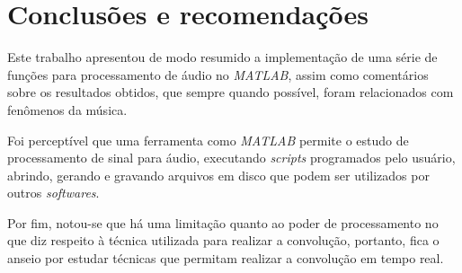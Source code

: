 \documentclass[
	12pt,				%
	article,			%
	openright,			%
	oneside,
	a4paper,			%
	chapter=TITLE,		%
	section=TITLE,		%
	english,			%
	french,				%
	spanish,			%
	brazil,				%
]{abntex2}
\begin{document}
	
	\section[Conclusões e recomendações]{Conclusões e recomendações}
	
	Este trabalho apresentou de modo resumido a implementação de uma série de funções para processamento de áudio no \textit{MATLAB}, assim como comentários sobre os resultados obtidos, que sempre quando possível, foram relacionados com fenômenos da música.

	Foi perceptível que uma ferramenta como \textit{MATLAB} permite o estudo de processamento de sinal para áudio, executando \textit{scripts} programados pelo usuário, abrindo, gerando e gravando arquivos em disco que podem ser utilizados por outros \textit{softwares}.
	
	Por fim, notou-se que há uma limitação quanto ao poder de processamento no que diz respeito à técnica utilizada para realizar a convolução, portanto, fica o anseio por estudar técnicas que permitam realizar a convolução em tempo real.
	
	\postextual
	
	
	
	
	
\end{document}
